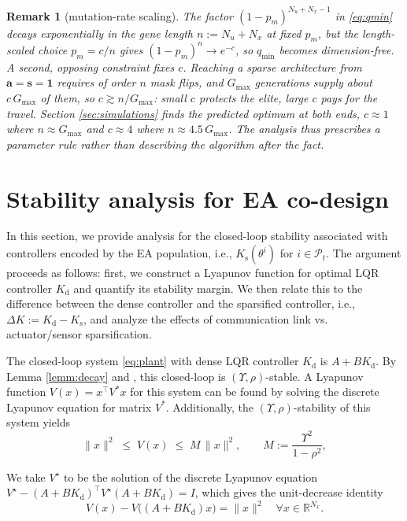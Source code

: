 \documentclass[letterpaper, 10pt, conference]{ieeeconf}
\newtheorem{remark}{Remark}
\begin{document}
\begin{remark}[mutation-rate scaling]\label{rem:pm}
The factor $(1-p_m)^{N_u+N_x-1}$ in \eqref{eq:qmin} decays exponentially in the
gene length $n := N_u+N_x$ at fixed $p_m$, but the length-scaled choice
$p_m = c/n$ gives $(1-p_m)^{n}\to e^{-c}$, so $q_{\min}$ becomes dimension-free.
A second, opposing constraint fixes $c$. Reaching a sparse architecture from
$\mathbf{a} = \mathbf{s} = \mathbf{1}$ requires of order $n$ mask flips, and
$G_{\max}$ generations supply about $c\,G_{\max}$ of them, so $c \gtrsim
n/G_{\max}$: small $c$ protects the elite, large $c$ pays for the travel.
Section \ref{sec:simulations} finds the predicted optimum at both ends,
$c \approx 1$ where $n \approx G_{\max}$ and $c \approx 4$ where
$n \approx 4.5\,G_{\max}$. The analysis thus prescribes a parameter rule rather
than describing the algorithm after the fact.
\end{remark}

\section{Stability analysis for EA co-design} \label{sec:stability}
In this section, we provide analysis for the closed-loop stability associated with controllers encoded by the EA population, i.e., $K_\mathrm{s}(\theta^i)$ for $i \in \mathcal{P}_t$.
The argument proceeds as follows: first, we construct a Lyapunov function for optimal LQR controller $K_\mathrm{d}$ and quantify its stability margin.
We then relate this to the difference between the dense controller and the sparsified controller, i.e., $\Delta K := K_{\mathrm{d}} - K_{\mathrm{s}}$, and analyze the effects of communication link vs. actuator/sensor sparsification.

The closed-loop system \eqref{eq:plant} with dense LQR controller $K_{\mathrm{d}}$ is $A+BK_{\mathrm{d}}$. By Lemma \ref{lemm:decay} and \cite[Theorem~A.7]{shin}, this closed-loop is $(\Upsilon,\rho)$-stable. A Lyapunov function $V(x) = x^\top V^* x$ for this system can be found by solving the discrete Lyapunov equation for matrix $V^*$. Additionally, the $(\Upsilon,\rho)$-stability of this system yields
\begin{equation}\label{eq:lyap-sandwich}
  \|x\|^{2} \;\le\; V(x) \;\le\; M\,\|x\|^{2},
  \qquad M := \frac{\Upsilon^{2}}{1 - \rho^{2}},
\end{equation}

We take $V^\star$ to be the solution of the discrete Lyapunov equation
$V^\star - (A+BK_{\mathrm{d}})^\top V^\star (A+BK_{\mathrm{d}}) = I$, which gives
the unit-decrease identity
\begin{equation}\label{eq:lyap-decrease}
  V(x) - V\bigl((A+BK_{\mathrm{d}})x\bigr) = \|x\|^{2} \quad \forall x \in \mathbb{R}^{N_x}.
\end{equation}
\end{document}
